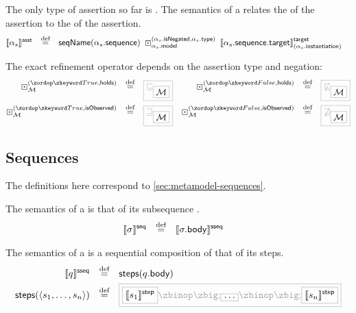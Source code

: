 \begin{definition}[\massertion]

\newcommand{\refop}[3]{\arefop_{#1}^{(#2, #3)}}

The only type of assertion so far is \msequenceassertion.  The semantics of a
\msequenceassertion{} relates the \msequence{} of the assertion to the
\mtarget{} of the assertion.
%
\begin{align*}
	\asstsema{\asasst}
\quad\defeq\quad&
	\seqnameOf{\field{\asasst}{sequence}}
	\;
	\refop{\field{\asasst}{model}}{\field{\asasst}{isNegated}}{\field{\asasst}{type}}
	\;
	\targetsema{\field{\field{\asasst}{sequence}}{target}}{\field{\asasst}{instantiation}}
\end{align*}

The exact refinement operator depends on the assertion type and negation:
%
\begin{align*}
	\refop{\amodel}{\true}{\mathsf{holds}}
\quad\defeq\quad&
	\tlang{\sqsubseteq_{\olang{\amodel}}}
&
	\refop{\amodel}{\false}{\mathsf{holds}}
\quad\defeq\quad&
	\tlang{\not\sqsubseteq_{\olang{\amodel}}}
\\
	\refop{\amodel}{\true}{\mathsf{isObserved}}
\quad\defeq\quad&
	\tlang{\sqsupseteq_{\olang{\amodel}}}
&
	\refop{\amodel}{\false}{\mathsf{isObserved}}
\quad\defeq\quad&
	\tlang{\not\sqsupseteq_{\olang{\amodel}}}
\\
\end{align*}
\end{definition}


\subsection{Sequences}\label{ssec:semantics-tockcsp-sequences}

The definitions here correspond to \cref{sec:metamodel-sequences}.

\begin{definition}[\msequence]

The semantics of a \msequence{} is that of its subsequence
.
%
\begin{align*}
	\llbracket \sigma \rrbracket^{\mathsf{seq}}
\quad\mathbin{\overset{\text{def}}=}\quad&	
	\llbracket \sigma.\mathsf{body} \rrbracket^{\mathsf{sseq}}
\end{align*}

\end{definition}

\begin{definition}[\msubsequence]

The semantics of a \msubsequence{} is a sequential composition of that of its steps.
%
\begin{align*}
	\sseqsema{\asseq}
	\quad\defeq\quad&	
	\funcname{steps}(\field{\asseq}{body})
\\
	\funcname{steps}(\langle \astep_1, \dotsc, \astep_n \rangle)
	\quad\defeq\quad&	
	\tlang{
	\olang{\stepsema{\astep_1}}
	\circseq
	\olang{\dotso}
	\circseq
	\olang{\stepsema{\astep_n}}
	}
\end{align*}

\end{definition}

